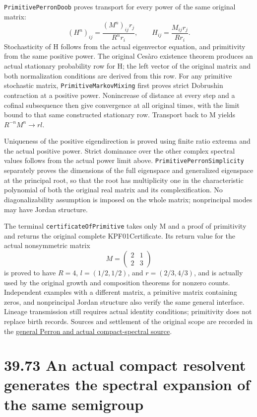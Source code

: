 \documentclass[
  english,
  11pt,
  oneside]{book}
\begin{document}
\nolinkurl{PrimitivePerronDoob} proves transport for every power of the same original matrix: \[(H^n)_{ij}=\frac{(M^n)_{ij}r_j}{R^n r_i},\qquad
H_{ij}=\frac{M_{ij}r_j}{Rr_i}.\] Stochasticity of H follows from the actual eigenvector equation, and primitivity from the same positive power. The original Cesàro existence theorem produces an actual stationary probability row for H; the left vector of the original matrix and both normalization conditions are derived from this row. For any primitive stochastic matrix, \nolinkurl{PrimitiveMarkovMixing} first proves strict Dobrushin contraction at a positive power. Nonincrease of distance at every step and a cofinal subsequence then give convergence at all original times, with the limit bound to that same constructed stationary row. Transport back to M yields \(R^{-n}M^n\to rl\).

Uniqueness of the positive eigendirection is proved using finite ratio extrema and the actual positive power. Strict dominance over the other complex spectral values follows from the actual power limit above. \nolinkurl{PrimitivePerronSimplicity} separately proves the dimensions of the full eigenspace and generalized eigenspace at the principal root, so that the root has multiplicity one in the characteristic polynomial of both the original real matrix and its complexification. No diagonalizability assumption is imposed on the whole matrix; nonprincipal modes may have Jordan structure.

The terminal \nolinkurl{certificateOfPrimitive} takes only M and a proof of primitivity and returns the original complete KPF01Certificate. Its return value for the actual nonsymmetric matrix \[M=\begin{pmatrix}2&1\\2&3\end{pmatrix}\] is proved to have \(R=4\), \(l=(1/2,1/2)\), and \(r=(2/3,4/3)\), and is actually used by the original growth and composition theorems for nonzero counts. Independent examples with a different matrix, a primitive matrix containing zeros, and nonprincipal Jordan structure also verify the same general interface. Lineage transmission still requires actual identity conditions; primitivity does not replace birth records. Sources and settlement of the original scope are recorded in the \href{../formalization/ueot-core/docs/compression/theory_completion/unified_closure/general_perron_compact_spectral_source_v1/RESULTS_AND_OPEN_OBLIGATIONS.md}{general Perron and actual compact-spectral source}.

\section{39.73 An actual compact resolvent generates the spectral expansion of the same semigroup}\label{an-actual-compact-resolvent-generates-the-spectral-expansion-of-the-same-semigroup}
\end{document}
